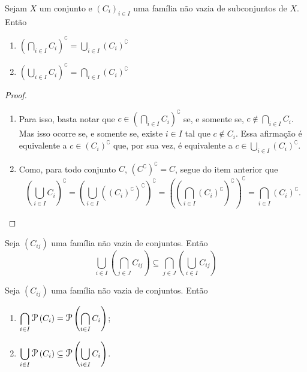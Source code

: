 \begin{prop}
Sejam $X$ um conjunto e $(C_i)_{i \in I}$ uma família não vazia de subconjuntos de $X$. Então
	\begin{enumerate}
	\item $\displaystyle \left( \bigcap_{i \in I} C_i \right)^\complement = \bigcup_{i \in I} (C_i)^\complement$
	
	\item $\displaystyle \left( \bigcup_{i \in I} C_i \right)^\complement = \bigcap_{i \in I} (C_i)^\complement$
	\end{enumerate}
\end{prop}
\begin{proof}
	\begin{enumerate}
	\item Para isso, basta notar que $c \in \left( \bigcap_{i \in I} C_i \right)^\complement$ se, e somente se, $c \notin \bigcap_{i \in I} C_i$. Mas isso ocorre se, e somente se, existe $i \in I$ tal que $c \notin C_i$. Essa afirmação é equivalente a $c \in (C_i)^\complement$ que, por sua vez, é equivalente a $ c \in \bigcup_{i \in I} (C_i)^\complement$.
	
		\item Como, para todo conjunto $C$, $(C^\complement)^\complement = C$, segue do item anterior que
		\begin{equation*}
		\displaystyle \left( \bigcup_{i \in I} C_i \right)^\complement = \left( \bigcup_{i \in I} ((C_i)^\complement)^\complement \right)^\complement = \left( \left( \bigcap_{i \in I} (C_i)^\complement \right)^\complement \right)^\complement = \bigcap_{i \in I} (C_i)^\complement.
		\end{equation*}
	\end{enumerate}
\end{proof}

\begin{prop}
Seja $(C_{ij})$ uma família não vazia de conjuntos. Então
	\begin{equation*}
	\bigcup_{i \in I} \left( \bigcap_{j \in J} C_{ij} \right) \subseteq \bigcap_{j \in J} \left( \bigcup_{i \in I} C_{ij} \right)
	\end{equation*}
\end{prop}

\begin{prop}
Seja $(C_{ij})$ uma família não vazia de conjuntos. Então
	\begin{enumerate}
	\item $\displaystyle\bigcap_{i \in I} \p\left(C_i \right) = \p\left(\displaystyle\bigcap_{i \in I} C_i \right)$;
	\item $\displaystyle\bigcup_{i \in I} \p\left(C_i \right) \subseteq \p\left(\displaystyle\bigcup_{i \in I} C_i \right)$.
	\end{enumerate}
\end{prop}





